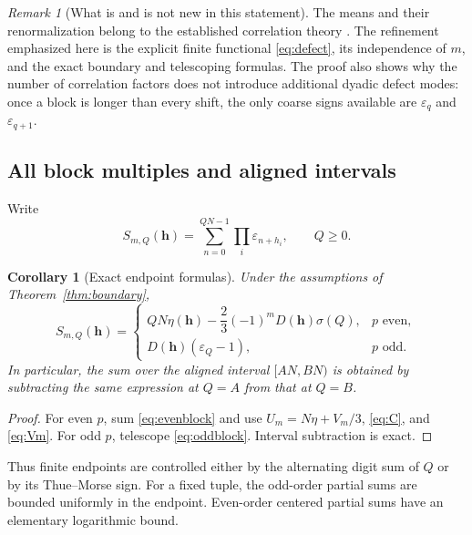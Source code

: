 \documentclass[11pt,oneside]{article}
\numberwithin{equation}{section}
\newtheorem{corollary}[theorem]{Corollary}
\theoremstyle{definition}
\theoremstyle{remark}
\newtheorem{remark}[theorem]{Remark}
\newcommand{\eps}{\varepsilon}
\begin{document}
\begin{remark}[What is and is not new in this statement]
The means and their renormalization belong to the established correlation
theory \cite{baakecoons}. The refinement emphasized here is the explicit finite
functional \eqref{eq:defect}, its independence of \(m\), and the exact boundary
and telescoping formulas. The proof also shows why the number of correlation
factors does not introduce additional dyadic defect modes: once a block is
longer than every shift, the only coarse signs available are \(\eps_q\) and
\(\eps_{q+1}\).
\end{remark}

\subsection{All block multiples and aligned intervals}
Write
\[
 S_{m,Q}(\bm h)=\sum_{n=0}^{QN-1}\prod_i\eps_{n+h_i},\qquad Q\ge0.
\]

\begin{corollary}[Exact endpoint formulas]
\label{cor:blockmultiples}
Under the assumptions of Theorem~\ref{thm:boundary},
\begin{equation}
 S_{m,Q}(\bm h)=
 \begin{cases}
 QN\eta(\bm h)-\dfrac23(-1)^mD(\bm h)\sigma(Q),&p\text{ even},\\[2mm]
 D(\bm h)(\eps_Q-1),&p\text{ odd}.
 \end{cases}
 \label{eq:allblocks}
\end{equation}
In particular, the sum over the aligned interval \([AN,BN)\) is obtained by
subtracting the same expression at \(Q=A\) from that at \(Q=B\).
\end{corollary}
\begin{proof}
For even \(p\), sum \eqref{eq:evenblock} and use
\(U_m=N\eta+V_m/3\), \eqref{eq:C}, and \eqref{eq:Vm}.
For odd \(p\), telescope \eqref{eq:oddblock}. Interval subtraction is exact.
\end{proof}

Thus finite endpoints are controlled either by the alternating digit sum of
\(Q\) or by its Thue--Morse sign. For a fixed tuple, the odd-order partial sums
are bounded uniformly in the endpoint. Even-order centered partial sums have
an elementary logarithmic bound.
\end{document}
